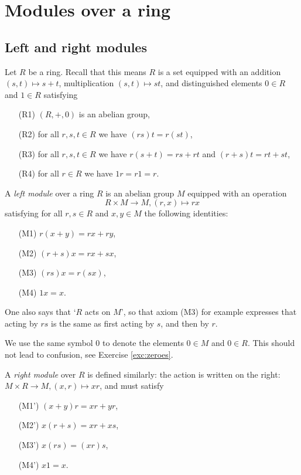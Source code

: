 
\chapter{Modules over a ring}
\label{chapter:modules}


\section{Left and right modules}

Let $R$ be a ring. Recall that this means $R$ is a set equipped with an addition $(s,t)\mapsto s+t$, multiplication $(s,t)\mapsto st$, and distinguished elements $0\in R$ and $1\in R$ satisfying 
\begin{enumerate}
\item[(R1)] $(R,+,0)$ is an abelian group,
\item[(R2)] for all $r,s,t \in R$ we have $(rs)t = r(st)$,
\item[(R3)] for all $r,s,t \in R$ we have $r(s+t) = rs+rt$ and $(r+s)t=rt+st$,
\item[(R4)] for all $r\in R$ we have $1r = r1=r$.
\end{enumerate}


\begin{definition}A \emph{left module} over a ring $R$ is an abelian group $M$ equipped with an operation
\[
	R\times M \to M, (r,x) \mapsto rx
\]
satisfying for all $r,s\in R$ and $x,y \in M$ the following identities:
\begin{enumerate}
\item[(M1)] $r(x+y)=rx+ry$,
\item[(M2)] $(r+s)x=rx+sx$,
\item[(M3)] $(rs)x=r(sx)$,
\item[(M4)] $1x=x$.
\end{enumerate}
\end{definition}

One also says that `$R$ acts on $M$', so that axiom (M3) for example expresses that acting by $rs$ is the same as first acting by $s$, and then by $r$.

We use the same symbol $0$ to denote the elements $0\in M$ and $0\in R$. This should not lead to confusion, see Exercise \ref{exc:zeroes}.

A \emph{right module} over $R$ is defined similarly: the action is written on the right: $M\times R\to M, (x,r) \mapsto xr$, and must satisfy
\begin{enumerate}
\item[(M1')] $(x+y)r=xr+yr$,
\item[(M2')] $x(r+s)=xr+xs$,
\item[(M3')] $x(rs)=(xr)s$,
\item[(M4')] $x1=x$.
\end{enumerate}

